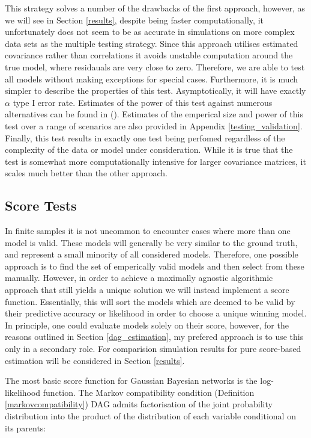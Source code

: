 \documentclass{article}
\begin{document}
This strategy solves a number of the drawbacks of the first approach, however, as we will see in Section \ref{results}, despite being faster computationally, it unfortunately does not seem to be as accurate in simulations on more complex data sets as the multiple testing strategy. Since this approach utilises estimated covariance rather than correlations it avoids unstable computation around the true model, where residauals are very close to zero. Therefore, we are able to test all models without making exceptions for special cases. Furthermore, it is much simpler to describe the properties of this test. Asymptotically, it will have exactly $\alpha$ type I error rate. Estimates of the power of this test against numerous alternatives can be found in \citeauthor{wang2013necessary} (\citeyear{wang2013necessary}). Estimates of the emperical size and power of this test over a range of scenarios are also provided in Appendix \ref{testing_validation}. Finally, this test results in exactly one test being perfomed regardless of the complexity of the data or model under consideration. While it is true that the test is somewhat more computationally intensive for larger covariance matrices, it scales much better than the other approach. 

\subsection{Score Tests} \label{scoretests}

In finite samples it is not uncommon to encounter cases where more than one model is valid. These models will generally be very similar to the ground truth, and represent a small minority of all considered models. Therefore, one possible approach is to find the set of emperically valid models and then select from these manually. However, in order to achieve a maximally agnostic algorithmic approach that still yields a unique solution we will instead implement a score function. Essentially, this will sort the models which are deemed to be valid by their predictive accuracy or likelihood in order to choose a unique winning model. In principle, one could evaluate models solely on their score, however, for the reasons outlined in Section \ref{dag_estimation}, my prefered approach is to use this only in a secondary role. For comparision simulation results for pure score-based estimation will be  considered in Section \ref{results}.

The most basic score function for Gaussian Bayesian networks is the log-likelihood function. The Markov compatibility condition (Definition \ref{markovcompatibility}) DAG admits factorisation of the joint probability distribution into the product of the distribution of each variable conditional on its parents:
\end{document}

